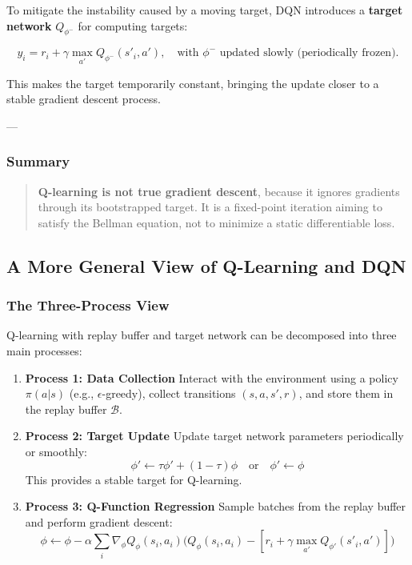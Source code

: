\documentclass[12pt]{article}
\theoremstyle{definition} %
\theoremstyle{plain} %
\theoremstyle{remark} %
\begin{document}
\begin{CJK}{UTF8}{gbsn}
To mitigate the instability caused by a moving target, DQN introduces a 
\textbf{target network} \(Q_{\phi^-}\) for computing targets:

\[
y_i = r_i + \gamma \max_{a'} Q_{\phi^-}(s'_i, a'),
\quad \text{with } \phi^- \text{ updated slowly (periodically frozen)}.
\]

This makes the target temporarily constant, bringing the update closer to a stable gradient descent process.

---

\subsubsection{Summary}

\begin{quote}
\textbf{Q-learning is not true gradient descent}, because it ignores gradients through its bootstrapped target.
It is a fixed-point iteration aiming to satisfy the Bellman equation, not to minimize a static differentiable loss.
\end{quote}


\subsection{A More General View of Q-Learning and DQN}

\subsubsection{The Three-Process View}

Q-learning with replay buffer and target network can be decomposed into three main processes:

\begin{enumerate}
    \item \textbf{Process 1: Data Collection}  
    Interact with the environment using a policy $\pi(a|s)$ (e.g., $\epsilon$-greedy), 
    collect transitions $(s, a, s', r)$, and store them in the replay buffer $\mathcal{B}$.
    
    \item \textbf{Process 2: Target Update}  
    Update target network parameters periodically or smoothly:
    \[
    \phi' \leftarrow \tau \phi' + (1 - \tau)\phi \quad \text{or} \quad \phi' \leftarrow \phi
    \]
    This provides a stable target for Q-learning.
    
    \item \textbf{Process 3: Q-Function Regression}  
    Sample batches from the replay buffer and perform gradient descent:
    \[
    \phi \leftarrow \phi - \alpha \sum_i 
    \nabla_\phi Q_\phi(s_i,a_i)
    \Big(Q_\phi(s_i,a_i) - [r_i + \gamma \max_{a'} Q_{\phi'}(s'_i,a')]\Big)
    \]
\end{enumerate}


\end{CJK}
\end{document}
